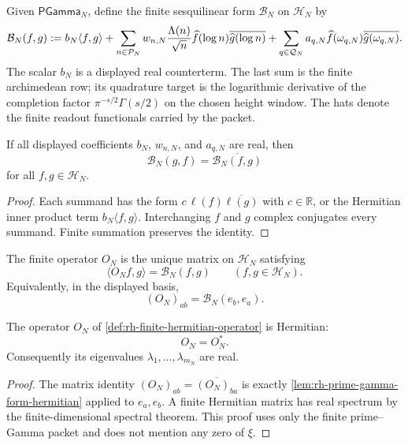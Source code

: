 \begin{definition}
\label{def:rh-completed-finite-explicit-formula-form}
Given $\mathsf{PGamma}_{N}$, define the finite sesquilinear form
$\mathcal B_N$ on $\mathcal H_N$ by
$$
\mathcal B_N(f,g)
:=
 b_N\langle f,g\rangle
 +\sum_{n\in\mathcal P_N}
 w_{n,N}{\Lambda(n)\over\sqrt n}
 \widehat f(\log n)\overline{\widehat g(\log n)}
 +\sum_{q\in\mathcal Q_N}
 a_{q,N}
 \widehat f(\omega_{q,N})\overline{\widehat g(\omega_{q,N})}.
$$
The scalar $b_N$ is a displayed real counterterm.  The last sum is the finite
archimedean row; its quadrature target is the logarithmic derivative of the
completion factor $\pi^{-s/2}\Gamma(s/2)$ on the chosen height window.  The
hats denote the finite readout functionals carried by the packet.
\end{definition}

\begin{lemma}
\label{lem:rh-prime-gamma-form-hermitian}
If all displayed coefficients $b_N$, $w_{n,N}$, and $a_{q,N}$ are real, then
$$
\mathcal B_N(g,f)=\overline{\mathcal B_N(f,g)}
$$
for all $f,g\in\mathcal H_N$.
\end{lemma}

\begin{proof}
Each summand has the form
$c\,\ell(f)\overline{\ell(g)}$ with $c\in\mathbb R$, or the Hermitian inner
product term $b_N\langle f,g\rangle$.  Interchanging $f$ and $g$ complex
conjugates every summand.  Finite summation preserves the identity.
\end{proof}

\begin{definition}
\label{def:rh-finite-hermitian-operator}
The finite operator $O_N$ is the unique matrix on $\mathcal H_N$ satisfying
$$
\langle O_N f,g\rangle=\mathcal B_N(f,g)
\qquad(f,g\in\mathcal H_N).
$$
Equivalently, in the displayed basis,
$$
(O_N)_{ab}=\mathcal B_N(e_b,e_a).
$$
\end{definition}

\begin{theorem}
\label{thm:rh-finite-operator-self-adjoint}
The operator $O_N$ of \autoref{def:rh-finite-hermitian-operator} is Hermitian:
$$
O_N=O_N^*.
$$
Consequently its eigenvalues $\lambda_1,\ldots,\lambda_{m_N}$ are real.
\end{theorem}

\begin{proof}
The matrix identity $(O_N)_{ab}=\overline{(O_N)_{ba}}$ is exactly
\autoref{lem:rh-prime-gamma-form-hermitian} applied to $e_a,e_b$.  A finite
Hermitian matrix has real spectrum by the finite-dimensional spectral theorem.
This proof uses only the finite prime--Gamma packet and does not mention any
zero of $\xi$.
\end{proof}

